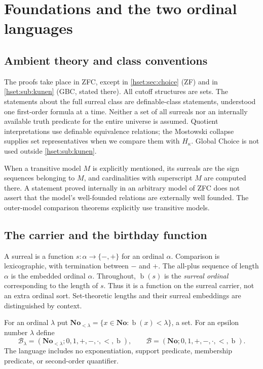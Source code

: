 \documentclass[11pt,letterpaper]{article}
\theoremstyle{definition}
\theoremstyle{remark}
\newcommand{\No}{\mathbf{No}}
\newcommand{\bd}{\operatorname{b}}
\newcommand{\B}{\mathcal B}
\begin{document}
\section{Foundations and the two ordinal languages}
\label{hset:sec:foundations}

\subsection{Ambient theory and class conventions}

The proofs take place in ZFC, except in \cref{hset:sec:choice} (ZF) and in
\cref{hset:sub:kunen} (GBC, stated there). All cutoff structures are sets. The
statements about the full surreal class are definable-class statements,
understood one first-order formula at a time. Neither a set of all surreals nor
an internally available truth predicate for the entire universe is assumed.
Quotient interpretations use definable equivalence relations; the Mostowski
collapse supplies set representatives when we compare them with $H_\kappa$.
Global Choice is not used outside \cref{hset:sub:kunen}.

When a transitive model $M$ is explicitly mentioned, its surreals are the sign
sequences belonging to $M$, and cardinalities with superscript $M$ are computed
there. A statement proved internally in an arbitrary model of ZFC does not
assert that the model's well-founded relations are externally well founded.
The outer-model comparison theorems explicitly use transitive models.

\subsection{The carrier and the birthday function}

A surreal is a function $s:\alpha\longrightarrow\{-,+\}$ for an ordinal
$\alpha$. Comparison is lexicographic, with termination between $-$ and $+$.
The all-plus sequence of length $\alpha$ is the embedded ordinal $\alpha$.
Throughout, $\bd(s)$ is the \emph{surreal ordinal} corresponding to the length
of $s$. Thus it is a function on the surreal carrier, not an extra ordinal
sort. Set-theoretic lengths and their surreal embeddings are distinguished
by context.

For an ordinal $\lambda$ put $\No_{<\lambda}=\{x\in\No:\bd(x)<\lambda\}$, a set.
For an epsilon number $\lambda$ define
\[
 \B_\lambda=(\No_{<\lambda};0,1,+,-,\cdot,<,\bd),
 \qquad
 \B=(\No;0,1,+,-,\cdot,<,\bd).
\]
The language includes no exponentiation, support predicate, membership
predicate, or second-order quantifier.
\end{document}
